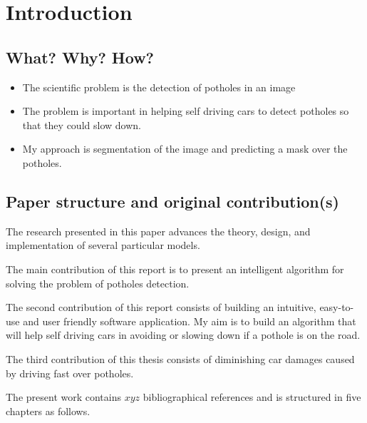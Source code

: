 \documentclass[runningheads,a4paper,11pt]{report}
\begin{document}
\tableofcontents

\newpage




\newpage



 


\chapter{Introduction}
\label{chapter:introduction}

\section{What? Why? How?}
\label{section:what}

\begin{itemize}
	\item The scientific problem is the detection of potholes in an image
	\item The problem is important in helping self driving cars to detect potholes so that they could slow down.
	\item My approach is segmentation of the image and predicting a mask over the potholes.
\end{itemize}


\section{Paper structure and original contribution(s)}
\label{section:structure}

The research presented in this paper advances the theory, design, and implementation of several particular models. 

The main contribution of this report is to present an intelligent algorithm for solving the problem of potholes detection.

The second contribution of this report consists of building an intuitive, easy-to-use and user friendly software application. My aim is to build an algorithm that will help self driving cars in avoiding or slowing down if a pothole is on the road.

The third contribution of this thesis consists of diminishing car damages caused by driving fast over potholes.


The present work contains $xyz$ bibliographical references and is structured in five chapters as follows.
\end{document}

